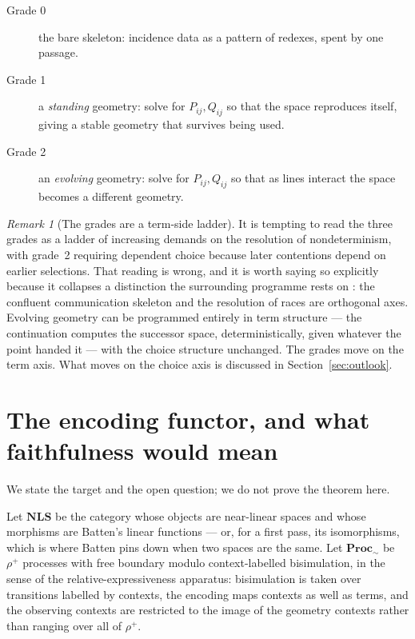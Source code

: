 \documentclass[11pt]{article}
\theoremstyle{plain}
\theoremstyle{definition}
\theoremstyle{remark}
\newtheorem{remark}[theorem]{Remark}
\newcommand{\Proc}{\mathbf{Proc}}
\newcommand{\NLS}{\mathbf{NLS}}
\begin{document}
\begin{description}
\item[Grade 0] the bare skeleton: incidence data as a pattern of redexes, spent by one
passage.
\item[Grade 1] a \emph{standing} geometry: solve for $P_{ij}, Q_{ij}$ so that the space
reproduces itself, giving a stable geometry that survives being used.
\item[Grade 2] an \emph{evolving} geometry: solve for $P_{ij}, Q_{ij}$ so that as lines
interact the space becomes a different geometry.
\end{description}

\begin{remark}[The grades are a term-side ladder]
It is tempting to read the three grades as a ladder of increasing demands on the
resolution of nondeterminism, with grade~2 requiring dependent choice because later
contentions depend on earlier selections. That reading is wrong, and it is worth saying
so explicitly because it collapses a distinction the surrounding programme rests on
\cite[Principle 1]{Choice}: the confluent communication skeleton and the resolution of
races are orthogonal axes. Evolving geometry can be programmed entirely in term structure
--- the continuation computes the successor space, deterministically, given whatever the
point handed it --- with the choice structure unchanged. The grades move on the term axis.
What moves on the choice axis is discussed in Section~\ref{sec:outlook}.
\end{remark}

\section{The encoding functor, and what faithfulness would mean}
\label{sec:functor}

We state the target and the open question; we do not prove the theorem here.

Let $\NLS$ be the category whose objects are near-linear spaces and whose morphisms are
Batten's linear functions \cite[\S1.7]{Batten} --- or, for a first pass, its isomorphisms,
which is where Batten pins down when two spaces are the same. Let $\Proc_{\sim}$ be
$\rho^{+}$ processes with free boundary modulo context-labelled bisimulation, in the sense
of the relative-expressiveness apparatus: bisimulation is taken over transitions labelled
by contexts, the encoding maps contexts as well as terms, and the observing contexts are
restricted to the image of the geometry contexts rather than ranging over all of
$\rho^{+}$.
\end{document}
